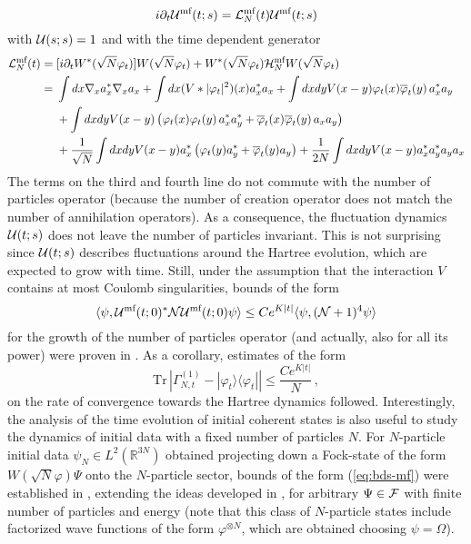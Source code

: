 \documentclass[11pt,a4paper,DIV11]{scrartcl}	%
\newcommand{\cU}{{\cal U}}
\newcommand{\bR}{{\mathbb R}}
\newcommand{\tr}{\mbox{Tr}}
\newcommand{\cF}{{\cal F}}
\newcommand{\cH}{{\cal H}}
\newcommand{\cL}{{\cal L}}
\newcommand{\cN}{{\cal N}}
\begin{document}
\[ i\partial_t \cU^{\text{mf}} (t;s) = \cL^{\text{mf}}_N (t) \cU^{\text{mf}} (t;s) \]
with $\cU (s;s) = 1$ and with the time dependent generator
\begin{equation}\label{eq:cL-mf} \begin{split} 
\cL^{\text{mf}}_N (t) = \; & [i\partial_t W^* (\sqrt{N} \varphi_t)] W(\sqrt{N} \varphi_t) + W^* (\sqrt{N} \varphi_t) \cH^{\text{mf}}_N W(\sqrt{N} \varphi_t) \\  = \; &\int dx \nabla_x a_x^* \nabla_x a_x + \int dx ( V*|\varphi_t|^2) (x) a_x^* a_x + \int dx dy V(x-y) \varphi_t (x) \overline{\varphi}_t (y) \, a_x^* a_y \\ &+  \int dx dy V(x-y)  \left(\varphi_t (x) \varphi_t (y) \, a_x^* a^*_y + \overline{\varphi}_t (x) \overline{\varphi}_t (y) \, a_x a_y \right) \\
&+\frac{1}{\sqrt{N}} \int dx dy V(x-y) a_x^* \left( \varphi_t (y) a_y^* + \overline{\varphi}_t (y) a_y \right) + \frac{1}{2N} \int dx dy V(x-y) a_x^* a_y^* a_y a_x \end{split} \end{equation}
The terms on the third and fourth line do not commute with the number of particles operator (because the number of creation operator does not match the number of annihilation operators). As a consequence, the fluctuation dynamics $\cU (t;s)$ does not leave the number of particles invariant. This is not surprising since $\cU (t;s)$ describes fluctuations around the Hartree evolution, which are expected to grow with time. Still, under the assumption that the interaction $V$ contains at most Coulomb singularities, bounds of the form
\[ \langle \psi , \cU^{\text{mf}} (t;0)^* \cN \cU^{\text{mf}} (t;0) \psi \rangle \leq C e^{K |t|} \langle \psi, (\cN+1)^{4} \psi \rangle \]
for the growth of the number of particles operator (and actually, also for all its power) were proven in \cite{RS}. As a corollary, estimates of the form
\begin{equation}\label{eq:bds-mf} \tr \, \left| \Gamma_{N,t}^{(1)} - |\varphi_t \rangle \langle \varphi_t| \right| \leq \frac{C e^{K|t|}}{N} \, , \end{equation}
on the rate of convergence towards the Hartree dynamics followed. Interestingly, the analysis of the time evolution of initial coherent states is also useful to study the dynamics of initial data with a fixed number of particles $N$. For $N$-particle initial data $\psi_N \in L^2 (\bR^{3N})$ obtained projecting down a Fock-state of the form $W(\sqrt{N} \varphi) \Psi$ onto the $N$-particle sector, bounds of the form (\ref{eq:bds-mf}) were established in \cite{CLS}, extending the ideas developed in \cite{RS}, for arbitrary $\Psi \in \cF$ with finite number of particles and energy (note that this class of $N$-particle states include factorized wave functions of the form $\varphi^{\otimes N}$, which are obtained choosing $\psi = \Omega$). 
\end{document}
